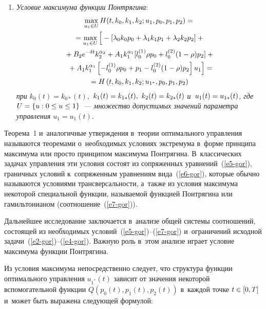 \begin{multicols}{2}
\begin{enumerate}[1.]
\item \textit{Условие максимума функции Понтрягина}:
\begin{multline} 
\max_{u_1 \in U}H(t,k_0,k_1,k_2;u_1,p_0,p_1,p_2)={}\\
{}=\max_{u_1 \in U} \left[
\vphantom{\left[-l^{(1)}_0\rho p_0+p_1-l^{(2)}_0(1-\rho)p_2
\right]}
-\left[\lambda_0k_0p_0+\lambda_1k_1p_1+\lambda_2k_2p_2
\right]+{}\right.\\
{}+B_2 e^{-\delta t}k^{\alpha_2}_2+ A_1k^{\alpha_1}_1 [l^{(1)}_0 \rho p_0+l^{(2)}_0(1-\rho)p_2]+{}\\
\left.{}+
A_1k^{\alpha_1}_1\left[-l^{(1)}_0\rho p_0+p_1-l^{(2)}_0(1-\rho)p_2
\right]u_1 \right]=
\\
=H\left(t,k_0,k_1,k_2;u_{1^*},p_0,p_1,p_2\right) 
\label{e7-gor}
\end{multline}
\textit{при $k_{0}(t)=k_{0*}(t),$ $k_{1}(t)\hm=k_{1*}(t),$ $k_{2}(t)\hm=k_{2*}(t)$
и~$u_{1}(t)\hm=u_{1*}(t)$, где $U\hm=\{u: 0 \leq u \hm\leq 1 \}$~--- 
множество допустимых значений параметра управ\-ле\-ния $u_1=u_1(t)$}.
\end{enumerate}

Теорема~1 и~аналогичные утверждения в~теории оптимального управ\-ле\-ния 
называются теоремами о~необходимых условиях экстремума в~форме принципа максимума 
или просто принципом максимума Понтрягина. В~классических задачах управ\-ле\-ния 
эти условия состоят из сопряженных уравнений~(\ref{e5-gor}), граничных условий 
к~сопряженным уравнениям вида~(\ref{e6-gor}), которые обычно называются условиями 
трансверсальности, а~также из условия максимума некоторой специальной функции, 
называемой функцией Понтрягина или гамильтонианом (соотношение~(\ref{e7-gor})).

Дальнейшее исследование заключается в~анализе общей системы соотношений, состоящей 
из необходимых условий~(\ref{e5-gor})--(\ref{e7-gor}) и~ограничений исходной 
задачи~(\ref{e2-gor})--(\ref{e4-gor}). Важную роль в~этом анализе играет условие 
максимума функции Понтрягина.

Из условия максимума непосредственно следует, что структура функции 
оптимального управ\-ле\-ния $u_{1^*}(t)$ зависит от значения некоторой вспомогательной 
функции $Q(p_0(t),p_1(t),p_2(t))$ в~каждой точке $t \hm\in [0,T]$ и~может быть выражена 
следующей формулой:


\end{multicols}
